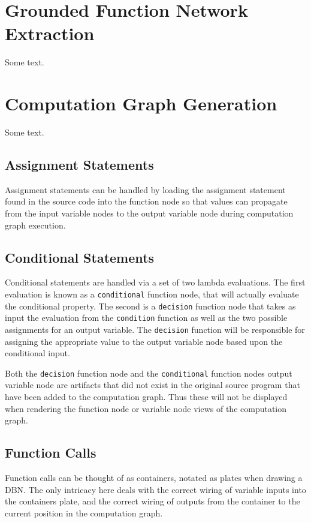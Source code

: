 \section{Grounded Function Network Extraction\label{sec:grfn_extract}}

Some text.

\section{Computation Graph Generation\label{sec:cg_gen}}

Some text.

\subsection{Assignment Statements\label{sec:assg_stmts}}
Assignment statements can be handled by loading the assignment statement found in the source code into the function node so that values can propagate from the input variable nodes to the output variable node during computation graph execution.

\subsection{Conditional Statements\label{sec:cond_stmts}}
Conditional statements are handled via a set of two lambda evaluations. The first evaluation is known as a \texttt{conditional} function node, that will actually evaluate the conditional property. The second is a \texttt{decision} function node that takes as input the evaluation from the \texttt{condition} function as well as the two possible assignments for an output variable. The \texttt{decision} function will be responsible for assigning the appropriate value to the output variable node based upon the conditional input.

Both the \texttt{decision} function node and the \texttt{conditional} function nodes output variable node are artifacts that did not exist in the original source program that have been added to the computation graph. Thus these will not be displayed when rendering the function node or variable node views of the computation graph.

\subsection{Function Calls\label{sec:func_calls}}
Function calls can be thought of as containers, notated as plates when drawing a DBN. The only intricacy here deals with the correct wiring of variable inputs into the containers plate, and the correct wiring of outputs from the container to the current position in the computation graph.

